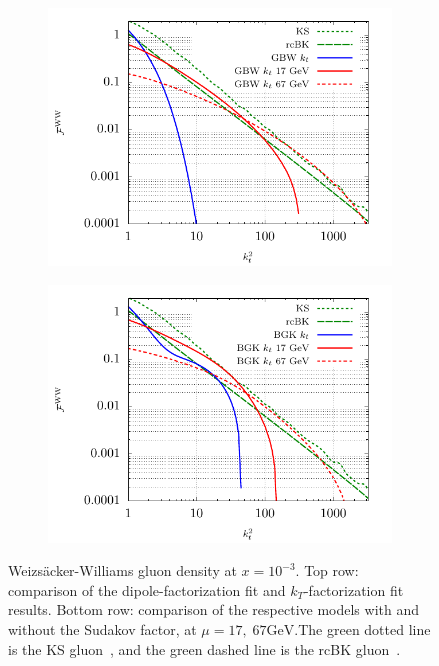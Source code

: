 \documentclass[11pt]{article}
\numberwithin{equation}{section}
\numberwithin{table}{section}
\numberwithin{figure}{section}
\begin{document}
\begin{figure}[t]
\begin{subfigure}{0.5\textwidth}
        \includegraphics[width=\textwidth]{plots/GBWWW2} 
    \end{subfigure}
    \begin{subfigure}{0.5\textwidth}
        \includegraphics[width=\textwidth]{plots/BGKWW2} 
    \end{subfigure}
    \caption{\footnotesize Weizs\"acker-Williams gluon density at $x=10^{-3}$. Top row: comparison of the dipole-factorization fit and $k_T$-factorization fit results. Bottom row: comparison of the respective models with and without the Sudakov factor, at $\mu=17,\;67 \mathrm{GeV}$.The green dotted line is the KS gluon~\cite{vanHameren:2021sqc}, and the green dashed line is the rcBK gluon~\cite{}. }
    \label{fig:ww}
\end{figure}
\end{document}
